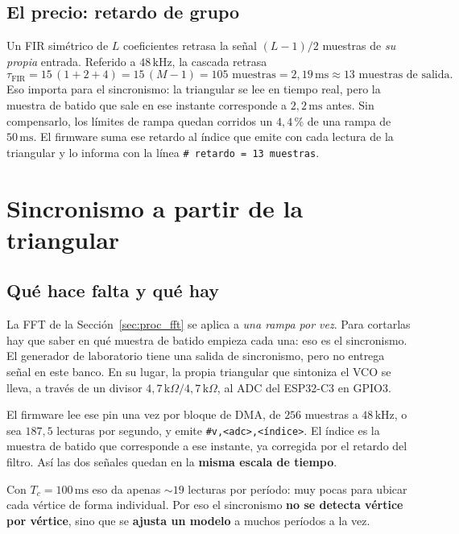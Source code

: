 \subsection{El precio: retardo de grupo}

Un FIR simétrico de $L$ coeficientes retrasa la señal $(L-1)/2$ muestras de
\emph{su propia} entrada. Referido a $48\,\text{kHz}$, la cascada retrasa
\begin{equation}
  \tau_\text{FIR} = 15\,(1 + 2 + 4) = 15\,(M-1) = 105 \text{ muestras}
  = 2{,}19\,\text{ms} \approx 13 \text{ muestras de salida}.
\end{equation}
Eso importa para el sincronismo: la triangular se lee en tiempo real, pero
la muestra de batido que sale en ese instante corresponde a $2{,}2\,\text{ms}$
antes. Sin compensarlo, los límites de rampa quedan corridos un $4{,}4$\,\%
de una rampa de $50\,\text{ms}$. El firmware suma ese retardo al índice que
emite con cada lectura de la triangular y lo informa con la línea
\texttt{\# retardo = 13 muestras}.

\section{Sincronismo a partir de la triangular}
\label{sec:proc_sincronismo}

\subsection{Qué hace falta y qué hay}

La FFT de la Sección~\ref{sec:proc_fft} se aplica a \emph{una rampa por
vez}. Para cortarlas hay que saber en qué muestra de batido empieza cada
una: eso es el sincronismo. El generador de laboratorio tiene una salida de
sincronismo, pero no entrega señal en este banco. En su lugar, la propia
triangular que sintoniza el VCO se lleva, a través de un divisor
$4{,}7\,\text{k}\Omega/4{,}7\,\text{k}\Omega$, al ADC del ESP32-C3 en GPIO3.

El firmware lee ese pin una vez por bloque de DMA, de $256$ muestras a
$48\,\text{kHz}$, o sea $187{,}5$ lecturas por segundo, y emite
\texttt{\#v,<adc>,<índice>}. El índice es la muestra de batido que
corresponde a ese instante, ya corregida por el retardo del filtro. Así las
dos señales quedan en la \textbf{misma escala de tiempo}.

Con $T_c = 100\,\text{ms}$ eso da apenas $\sim 19$ lecturas por período:
muy pocas para ubicar cada vértice de forma individual. Por eso el
sincronismo \textbf{no se detecta vértice por vértice}, sino que se
\textbf{ajusta un modelo} a muchos períodos a la vez.

